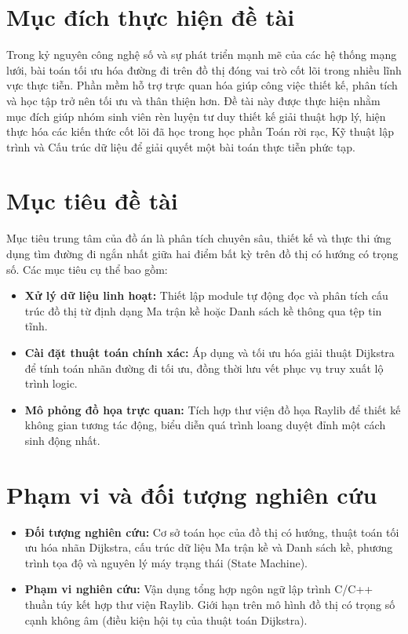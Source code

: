 \documentclass[12pt,a4paper,oneside]{report}
\begin{document}
\section{Mục đích thực hiện đề tài}
Trong kỷ nguyên công nghệ số và sự phát triển mạnh mẽ của các hệ thống mạng lưới, bài toán tối ưu hóa đường đi trên đồ thị đóng vai trò cốt lõi trong nhiều lĩnh vực thực tiễn. Phần mềm hỗ trợ trực quan hóa giúp công việc thiết kế, phân tích và học tập trở nên tối ưu và thân thiện hơn. Đề tài này được thực hiện nhằm mục đích giúp nhóm sinh viên rèn luyện tư duy thiết kế giải thuật hợp lý, hiện thực hóa các kiến thức cốt lõi đã học trong học phần Toán rời rạc, Kỹ thuật lập trình và Cấu trúc dữ liệu để giải quyết một bài toán thực tiễn phức tạp. 

\section{Mục tiêu đề tài}
Mục tiêu trung tâm của đồ án là phân tích chuyên sâu, thiết kế và thực thi ứng dụng tìm đường đi ngắn nhất giữa hai điểm bất kỳ trên đồ thị có hướng có trọng số. Các mục tiêu cụ thể bao gồm:
\begin{itemize}
    \item \textbf{Xử lý dữ liệu linh hoạt:} Thiết lập module tự động đọc và phân tích cấu trúc đồ thị từ định dạng Ma trận kề hoặc Danh sách kề thông qua tệp tin tĩnh.
    \item \textbf{Cài đặt thuật toán chính xác:} Áp dụng và tối ưu hóa giải thuật Dijkstra để tính toán nhãn đường đi tối ưu, đồng thời lưu vết phục vụ truy xuất lộ trình logic.
    \item \textbf{Mô phỏng đồ họa trực quan:} Tích hợp thư viện đồ họa Raylib để thiết kế không gian tương tác động, biểu diễn quá trình loang duyệt đỉnh một cách sinh động nhất.
\end{itemize}

\section{Phạm vi và đối tượng nghiên cứu}
\begin{itemize}
    \item \textbf{Đối tượng nghiên cứu:} Cơ sở toán học của đồ thị có hướng, thuật toán tối ưu hóa nhãn Dijkstra, cấu trúc dữ liệu Ma trận kề và Danh sách kề, phương trình tọa độ và nguyên lý máy trạng thái (State Machine).
    \item \textbf{Phạm vi nghiên cứu:} Vận dụng tổng hợp ngôn ngữ lập trình C/C++ thuần túy kết hợp thư viện Raylib. Giới hạn trên mô hình đồ thị có trọng số cạnh không âm (điều kiện hội tụ của thuật toán Dijkstra).
\end{itemize}
\end{document}
